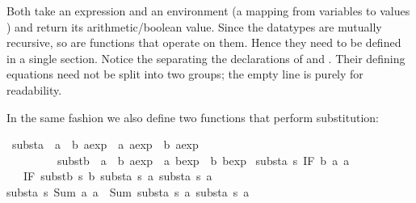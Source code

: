 \begin{isabellebody}
\begin{isamarkuptext}
Both take an expression and an environment (a mapping from variables
 to values ) and return its arithmetic/boolean
value. Since the datatypes are mutually recursive, so are functions
that operate on them. Hence they need to be defined in a single
 section. Notice the  separating
the declarations of  and . Their defining
equations need not be split into two groups;
the empty line is purely for readability.

In the same fashion we also define two functions that perform substitution:%
\end{isamarkuptext}%
\isamarkuptrue%
\isamarkupfalse%
\ substa\ {}{}\ {}{}{}a\ {}\ {}b\ aexp{}\ {}\ {}a\ aexp\ {}\ {}b\ aexp{}\ \isanewline
\ \ \ \ \ \ \ \ \ substb\ {}{}\ {}{}{}a\ {}\ {}b\ aexp{}\ {}\ {}a\ bexp\ {}\ {}b\ bexp{}\ \isanewline
{}substa\ s\ {}IF\ b\ a{}\ a{}{}\ {}\isanewline
\ \ \ IF\ {}substb\ s\ b{}\ {}substa\ s\ a{}{}\ {}substa\ s\ a{}{}{}\ {}\isanewline
{}substa\ s\ {}Sum\ a{}\ a{}{}\ {}\ Sum\ {}substa\ s\ a{}{}\ {}substa\ s\ a{}{}{}\ {}\isanewline

\end{isabellebody}

